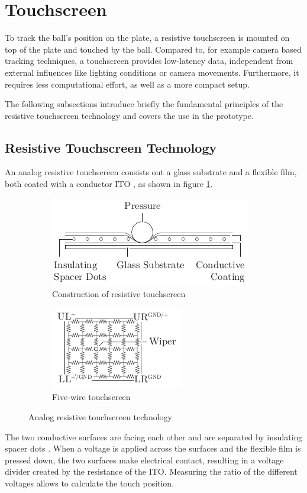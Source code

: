 \section{Touchscreen}
To track the ball's position on the plate, a resistive touchscreen is mounted
on top of the plate and touched by the ball. Compared to, for example camera
based tracking techniques, a touchscreen provides low-latency data,
independent from external influences like lighting conditions or camera
movements. Furthermore, it requires less computational effort, as well as a
more compact setup.

The following subsections introduce briefly the fundamental principles of the
resistive touchscreen technology and covers the use in the prototype.

\subsection{Resistive Touchscreen Technology}
An analog resistive touchscreen consists out a glass substrate and a flexible
film, both coated with a conductor \ac{ITO} \citep{Wal12}, as shown in figure
\ref{fig:touch_build}.
\begin{figure}
	\centering
	\begin{subfigure}{0.49\textwidth}
		\centering
		\includegraphics{../figures/touch_build}
		\caption{Construction of resistive touchscreen}
		\label{fig:touch_build}
	\end{subfigure}
	\begin{subfigure}{0.49\textwidth}
		\centering
		\includegraphics{../figures/touch_five}
		\caption{Five-wire touchscreen}
		\label{fig:touch_five}
	\end{subfigure}
	\caption{Analog resistive touchscreen technology \citep[adapted from][]{Wal12}}
	\label{fig:touch}
\end{figure}
The two conductive surfaces are facing each other and
are separated by insulating spacer dots \citep{Wal12}. When a voltage is
applied across the surfaces and the flexible film is pressed down, the two
surfaces make electrical contact, resulting in a voltage divider created by
the resistance of the \ac{ITO}. Measuring the ratio of the different voltages
allows to calculate the touch position.

